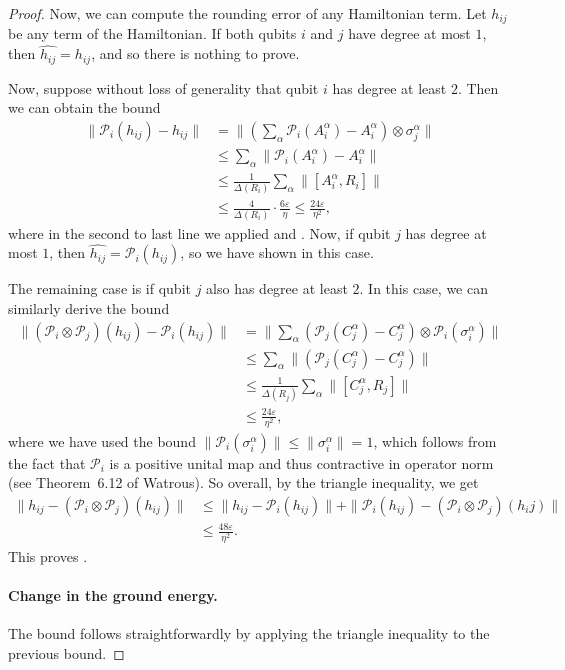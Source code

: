 \documentclass[11pt]{article}
\theoremstyle{plain}
\newcommand{\eps}{\varepsilon}
\renewcommand{\cP}{\mathcal{P}}
\begin{document}
\begin{proof}
Now, we can compute the rounding error of any Hamiltonian term. Let $h_{ij}$ be any term of the Hamiltonian. If both qubits $i$ and $j$ have degree at most $1$, then $\widehat{h_{ij}}= h_{ij}$, and so there is nothing to prove.

Now, suppose without loss of generality that qubit $i$ has degree at least $2$. Then we can obtain the bound
\begin{align}
    \| \cP_i(h_{ij}) - h_{ij} \| &= \| (\sum_\alpha \cP_i(A_i^\alpha)  - A_i^\alpha) \otimes \sigma_j^\alpha \| \\
    &\leq \sum_\alpha \| \cP_i(A_i^\alpha) - A_i^\alpha\| \\
    &\leq  \frac{1}{\Delta(R_i)} \sum_\alpha \|[A_i^\alpha, R_i] \| \\
    &\leq \frac{4}{\Delta(R_i)} \cdot \frac{6\eps}{\eta} \leq \frac{24\eps}{\eta^2},
 \end{align}
 where in the second to last line we applied  and . Now, if qubit $j$ has degree at most $1$, then $\widehat{h_{ij}} = \cP_i(h_{ij})$, so we have shown  in this case.

The remaining case is if qubit $j$ also has degree at least $2$. In this case, we can similarly derive the bound
\begin{align}
    \| (\cP_i \otimes \cP_j)(h_{ij}) - \cP_i(h_{ij}) \| &= \| \sum_\alpha (\cP_j(C_j^\alpha) - C_j^\alpha) \otimes \cP_i(\sigma_i^\alpha) \| \\
    &\leq  \sum_\alpha \| (\cP_j(C_j^\alpha) - C_j^\alpha) \| \\
    &\leq \frac{1}{\Delta(R_j)} \sum_\alpha \| [C_j^\alpha, R_j] \| \\
    &\leq \frac{24 \eps}{\eta^2},
\end{align}
where we have used the bound $\| \cP_i(\sigma_i^\alpha) \| \leq \| \sigma_i^\alpha \| = 1$, which follows from the fact that $\cP_i$ is a positive unital map and thus contractive in operator norm (see Theorem~6.12 of Watrous). 
So overall, by the triangle inequality, we get
\begin{align}
    \| h_{ij} - (\cP_i \otimes \cP_j)(h_{ij})  \| &\leq \| h_{ij} - \cP_i(h_{ij}) \| + \| \cP_i(h_{ij}) - (\cP_i \otimes \cP_j)(h_ij) \| \\
    &\leq \frac{48 \eps}{\eta^2}. 
\end{align}
This proves .

\paragraph{Change in the ground energy.}
The bound  follows straightforwardly by applying the triangle inequality to the previous bound.



\end{proof}
\end{document}
